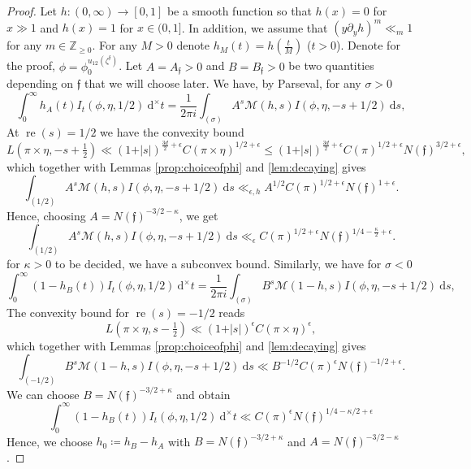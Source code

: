 \documentclass[a4paper,11pt]{amsart}
\theoremstyle{definition}
\newcommand{\Z}{\mathbb{Z}}
\newcommand{\real}{\operatorname{re}}
\begin{document}
\begin{proof}
 Let $h\colon (0,\infty)\to [0,1]$ be a smooth function so that $h(x) = 0$ for $x \gg 1$ and $h(x) = 1 $ for $x \in (0,1]$. In addition, we assume that $(y\partial_yh)^m \ll_m 1$ for any $m\in \Z_{\geq 0}$. For any $M> 0$ denote $h_{M}(t) = h\left(\frac{t}{M}\right)$ ($t>0$). Denote for the proof, $\phi = \phi_0^{u_{12}(\zeta^\mathfrak{f})}$. Let $A = A_{\mathfrak{f}}>0$ and $B=B_{\mathfrak{f}}>0$ be two quantities depending on $\mathfrak{f}$ that we will choose later.
    We have, by Parseval, for any $\sigma >0$
    \begin{equation*}\label{eq:parseval}
        \int_{0}^{\infty}h_A(t)I_t(\phi,\eta,1/2)\ \mathrm{d}^{\times}t = \frac{1}{2\pi i}\int_{(\sigma)}A^{s}\mathcal{M}(h,s)I(\phi,\eta,-s+1/2) \ \mathrm{d}s,
    \end{equation*}
    At $\real(s) = 1/2$ we have the convexity bound 
     \[L(\pi \times \eta, -s+\tfrac{1}{2}) \ll (1+\vert{s}\vert)^{\frac{3d}{2}+\epsilon} C(\pi\times \eta)^{1/2+\epsilon} \leq (1+\vert s \vert)^{\frac{3d}{2}+\epsilon}C(\pi)^{1/2+\epsilon}N(\mathfrak{f})^{3/2+\epsilon},  \]
    which together with Lemmas \ref{prop:choiceofphi} and \ref{lem:decaying} gives
    \begin{equation*}
        \int_{(1/2)}A^{s}\mathcal{M}(h,s)I(\phi,\eta,-s+1/2) \ \mathrm{d}s \ll_{\epsilon,h} A^{1/2}C(\pi)^{1/2+\epsilon}N(\mathfrak{f})^{1+\epsilon}.
    \end{equation*}
     Hence, choosing $A = N(\mathfrak{f})^{-3/2-\kappa}$, we get 
     \begin{equation*}
          \int_{(1/2)}A^{s}\mathcal{M}(h,s)I(\phi,\eta,-s+1/2) \ \mathrm{d}s \ll_{\epsilon} C(\pi)^{1/2+\epsilon}N(\mathfrak{f})^{1/4-\frac{\kappa}{2}+\epsilon}.
     \end{equation*}for $\kappa >0$ to be decided, we have a subconvex bound. 
    Similarly, we have for $\sigma <0$
    \begin{equation*}
         \int_{0}^{\infty}(1-h_B(t))I_t(\phi,\eta,1/2)\ \mathrm{d}^{\times}t = \frac{1}{2\pi i}\int_{(\sigma)}B^{s}\mathcal{M}(1-h,s)I(\phi,\eta,-s+1/2)\ \mathrm{d}s,
    \end{equation*}
     The convexity bound for $\real(s) = -1/2$ reads
    \[ L(\pi \times \eta,s-\tfrac{1}{2})  \ll (1+\vert{s}\vert)^{\epsilon} C(\pi\times \eta)^{\epsilon}, \] which together with Lemmas \ref{prop:choiceofphi} and \ref{lem:decaying} gives $$\int_{(-1/2)}B^{s}\mathcal{M}(1-h,s)I(\phi,\eta,-s+1/2)\ \mathrm{d}s\ll B^{-1/2}C(\pi)^\epsilon N(\mathfrak{ f})^{-1/2+\epsilon}.$$  We can choose $B= N(\mathfrak{f})^{-3/2+\kappa}$ and obtain 
     \begin{equation*}
         \int_{0}^{\infty}(1-h_B(t))I_t(\phi,\eta,1/2)\ \mathrm{d}^{\times}t \ll C(\pi)^{\epsilon}N(\mathfrak{f})^{1/4-\kappa/2+\epsilon}
    \end{equation*}
    Hence, we choose $h_0\coloneqq h_B- h_A$ with $B= N(\mathfrak{f})^{-3/2+\kappa}$ and $A=N(\mathfrak{f})^{-3/2-\kappa}$.
    
\end{proof}
\end{document}
